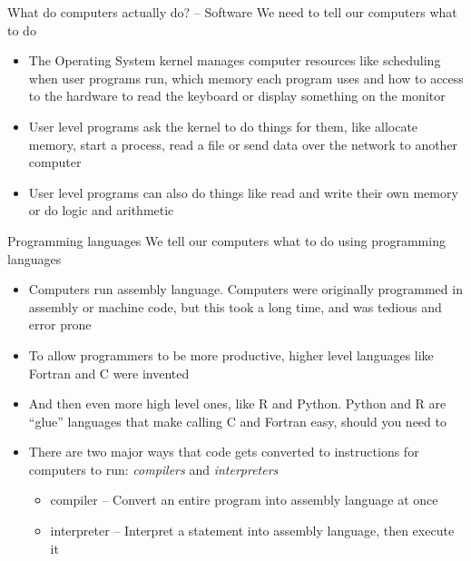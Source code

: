 \documentclass{beamer}
\begin{document}
\begin{frame}{What do computers actually do? -- Software}
	We need to tell our computers what to do
	\begin{itemize}
		\item The Operating System kernel manages computer resources like scheduling when
			user programs run, which memory each program uses and how to access to the hardware to
			read the keyboard or display something on the monitor
		\item User level programs ask the kernel to do things for
			them, like allocate memory, start a process, read a file or send data over the
			network to another computer
       \item User level programs can also do things like read and write their
	   own memory or do logic and arithmetic
	\end{itemize}
\end{frame}

\begin{frame}{Programming languages}
	We tell our computers what to do using programming languages
	\begin{itemize}	

		\item Computers run assembly language. Computers were originally
		programmed in assembly or machine code, but this took a long time, and
		was tedious and error prone
		
		\item To allow programmers to be more productive, higher level languages
		like Fortran and C were invented

		\item  And then even more high level ones, like R and Python. Python and R are
		``glue'' languages that make calling C and Fortran easy, should you need to

		\item There are two major ways that code gets converted to instructions for computers to run: \emph{compilers} and \emph{interpreters}
			\begin{itemize}
				\item{compiler} -- Convert an entire program into assembly language at once
				\item{interpreter} -- Interpret a statement into assembly language, then execute it
			\end{itemize}
	\end{itemize}
\end{frame}
\end{document}
